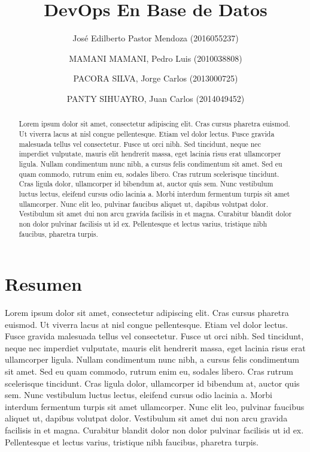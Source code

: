 \documentclass[preprint,12pt]{elsarticle}
\begin{document}
	
	\begin{frontmatter}

		\title{\huge  DevOps En Base de Datos}
		
		\author{José Edilberto Pastor Mendoza              (2016055237)}
		\author{MAMANI MAMANI, Pedro Luis              (2010038808)}
		\author{PACORA SILVA, Jorge Carlos                   (2013000725)}
		\author{PANTY SIHUAYRO, Juan Carlos               (2014049452)}
		
		\address{Tacna, Perú}
		
		\begin{abstract}
			
Lorem ipsum dolor sit amet, consectetur adipiscing elit. Cras cursus pharetra euismod. Ut viverra lacus at nisl congue pellentesque. Etiam vel dolor lectus. Fusce gravida malesuada tellus vel consectetur. Fusce ut orci nibh. Sed tincidunt, neque nec imperdiet vulputate, mauris elit hendrerit massa, eget lacinia risus erat ullamcorper ligula. Nullam condimentum nunc nibh, a cursus felis condimentum sit amet. Sed eu quam commodo, rutrum enim eu, sodales libero. Cras rutrum scelerisque tincidunt. Cras ligula dolor, ullamcorper id bibendum at, auctor quis sem. Nunc vestibulum luctus lectus, eleifend cursus odio lacinia a. Morbi interdum fermentum turpis sit amet ullamcorper. Nunc elit leo, pulvinar faucibus aliquet ut, dapibus volutpat dolor. Vestibulum sit amet dui non arcu gravida facilisis in et magna. Curabitur blandit dolor non dolor pulvinar facilisis ut id ex. Pellentesque et lectus varius, tristique nibh faucibus, pharetra turpis.


		\end{abstract}
\end{frontmatter}

	\section{Resumen}

Lorem ipsum dolor sit amet, consectetur adipiscing elit. Cras cursus pharetra euismod. Ut viverra lacus at nisl congue pellentesque. Etiam vel dolor lectus. Fusce gravida malesuada tellus vel consectetur. Fusce ut orci nibh. Sed tincidunt, neque nec imperdiet vulputate, mauris elit hendrerit massa, eget lacinia risus erat ullamcorper ligula. Nullam condimentum nunc nibh, a cursus felis condimentum sit amet. Sed eu quam commodo, rutrum enim eu, sodales libero. Cras rutrum scelerisque tincidunt. Cras ligula dolor, ullamcorper id bibendum at, auctor quis sem. Nunc vestibulum luctus lectus, eleifend cursus odio lacinia a. Morbi interdum fermentum turpis sit amet ullamcorper. Nunc elit leo, pulvinar faucibus aliquet ut, dapibus volutpat dolor. Vestibulum sit amet dui non arcu gravida facilisis in et magna. Curabitur blandit dolor non dolor pulvinar facilisis ut id ex. Pellentesque et lectus varius, tristique nibh faucibus, pharetra turpis.
\end{document}
